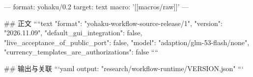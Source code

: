 ---
format: yohaku/0.2
target: text
macro: '[[macros/raw]]'
---

## 正文
````text
{
  "format": "yohaku-workflow-source-release/1",
  "version": "2026.11.09",
  "default_gui_integration": false,
  "live_acceptance_of_public_port": false,
  "model": "adaption/glm-53-flash/none",
  "currency_templates_are_authorizations": false
}
````

## 输出与关联
```yaml
output: "research/workflow-runtime/VERSION.json"
```
